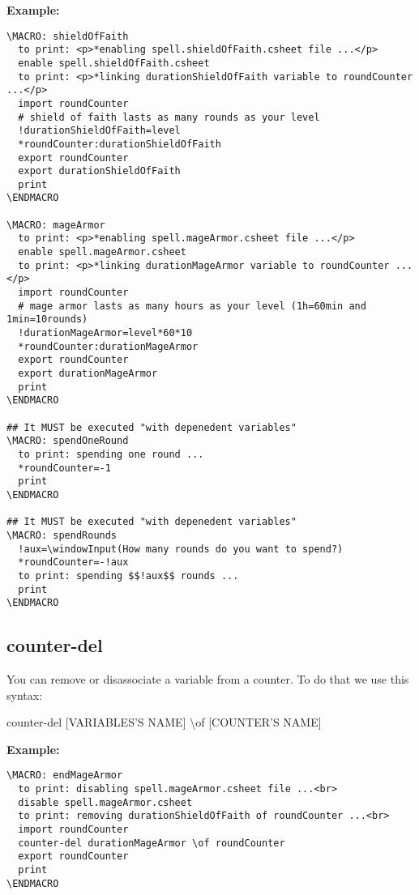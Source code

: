 \documentclass[11pt,a4paper,openright,oneside]{book}
\newenvironment{ex}
{
  \setlength{\parindent}{0cm}
  \large \textbf{Example:} \normalsize 
}
{}
\begin{document}
\begin{ex}
\small
  \begin{lstlisting}
\MACRO: shieldOfFaith
  to print: <p>*enabling spell.shieldOfFaith.csheet file ...</p>
  enable spell.shieldOfFaith.csheet
  to print: <p>*linking durationShieldOfFaith variable to roundCounter ...</p>
  import roundCounter
  # shield of faith lasts as many rounds as your level
  !durationShieldOfFaith=level
  *roundCounter:durationShieldOfFaith
  export roundCounter
  export durationShieldOfFaith
  print
\ENDMACRO

\MACRO: mageArmor
  to print: <p>*enabling spell.mageArmor.csheet file ...</p>
  enable spell.mageArmor.csheet
  to print: <p>*linking durationMageArmor variable to roundCounter ...</p>
  import roundCounter
  # mage armor lasts as many hours as your level (1h=60min and 1min=10rounds)
  !durationMageArmor=level*60*10
  *roundCounter:durationMageArmor
  export roundCounter
  export durationMageArmor
  print
\ENDMACRO

## It MUST be executed "with depenedent variables"
\MACRO: spendOneRound
  to print: spending one round ...
  *roundCounter=-1
  print
\ENDMACRO

## It MUST be executed "with depenedent variables"
\MACRO: spendRounds
  !aux=\windowInput(How many rounds do you want to spend?)
  *roundCounter=-!aux
  to print: spending $$!aux$$ rounds ...
  print
\ENDMACRO
  \end{lstlisting}
\normalsize
\end{ex}

\subsection{\textsf{counter-del}}

You can remove or disassociate a variable from a counter. To do that we use this syntax:
\begin{center} \textsf{counter-del \textsc{\scriptsize [VARIABLES'S NAME]} \textbackslash of \textsc{\scriptsize [COUNTER'S NAME]}} \end{center}

\begin{ex}
  \begin{lstlisting}
\MACRO: endMageArmor
  to print: disabling spell.mageArmor.csheet file ...<br>
  disable spell.mageArmor.csheet
  to print: removing durationShieldOfFaith of roundCounter ...<br>
  import roundCounter
  counter-del durationMageArmor \of roundCounter
  export roundCounter
  print
\ENDMACRO
  \end{lstlisting}
\end{ex}
\end{document}
